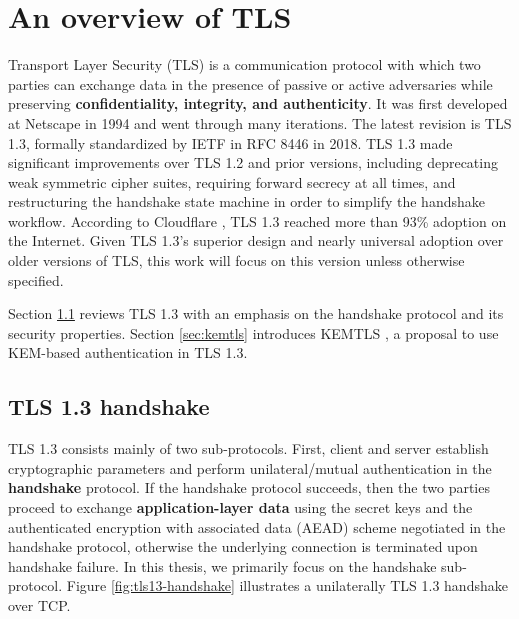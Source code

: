 \documentclass[letterpaper,12pt,titlepage,oneside,final]{book}
\begin{document}
\chapter{An overview of TLS}\label{sec:surveying-post-quantum-TLS}
Transport Layer Security (TLS) is a communication protocol with which two parties can exchange data in the presence of passive or active adversaries while preserving \textbf{confidentiality, integrity, and authenticity}.
It was first developed at Netscape in 1994 and went through many iterations.
The latest revision is TLS 1.3, formally standardized by IETF in RFC 8446 \cite{DBLP:journals/rfc/rfc8446} in 2018.
TLS 1.3 made significant improvements over TLS 1.2 \cite{DBLP:journals/rfc/rfc5246} and prior versions, including deprecating weak symmetric cipher suites, requiring forward secrecy at all times, and restructuring the handshake state machine in order to simplify the handshake workflow.
According to Cloudflare \cite{Westerbaan_2024}, TLS 1.3 reached more than 93\% adoption on the Internet.
Given TLS 1.3's superior design and nearly universal adoption over older versions of TLS, this work will focus on this version unless otherwise specified.

Section \ref{sec:overview-tls13-handshake} reviews TLS 1.3 with an emphasis on the handshake protocol and its security properties. Section \ref{sec:kemtls} introduces KEMTLS \cite{DBLP:conf/ccs/SchwabeSW20}, a proposal to use KEM-based authentication in TLS 1.3.

\section{TLS 1.3 handshake}\label{sec:overview-tls13-handshake}
TLS 1.3 consists mainly of two sub-protocols.
First, client and server establish cryptographic parameters and perform unilateral/mutual authentication in the {\bf handshake} protocol.
If the handshake protocol succeeds, then the two parties proceed to exchange {\bf application-layer data} using the secret keys and the authenticated encryption with associated data (AEAD) scheme negotiated in the handshake protocol, otherwise the underlying connection is terminated upon handshake failure.
In this thesis, we primarily focus on the handshake sub-protocol.
Figure \ref{fig:tls13-handshake} illustrates a unilaterally TLS 1.3 handshake over TCP. 
\end{document}
